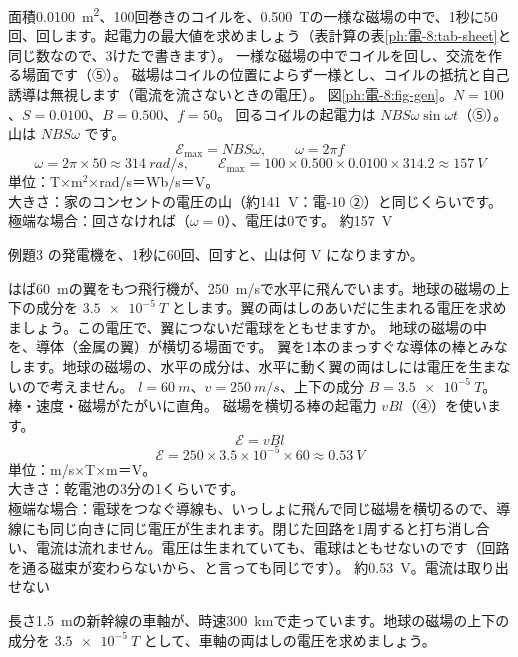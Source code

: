 \label{ph:電-8:ex3}
\begin{phreidai}
面積\qty{0.0100}{m^2}、100回巻きのコイルを、\qty{0.500}{T}の一様な磁場の中で、1秒に50回、回します。起電力の最大値を求めましょう（表計算の表\ref{ph:電-8:tab-sheet}と同じ数なので、3けたで書きます）。
\phbamen
一様な磁場の中でコイルを回し、交流を作る場面です（⑤）。
\phmushi
磁場はコイルの位置によらず一様とし、コイルの抵抗と自己誘導は無視します（電流を流さないときの電圧）。
\phzu
図\ref{ph:電-8:fig-gen}。$N=100$、$S=0.0100$、$B=0.500$、$f=50$。
\phriyu
回るコイルの起電力は $NBS\omega\sin\omega t$（⑤）。山は $NBS\omega$ です。
\phtateru
\[ \mathcal E_{\max}=NBS\omega,\qquad \omega=2\pi f \]
\phtoku
\[ \omega=2\pi\times50\approx\qty{314}{rad/s},\qquad \mathcal E_{\max}=100\times0.500\times0.0100\times314.2\approx\qty{157}{V} \]
\phtashikame
単位：T×m$^2$×rad/s＝Wb/s＝V。\\
大きさ：家のコンセントの電圧の山（約\qty{141}{V}：電-10 ②）と同じくらいです。\\
極端な場合：回さなければ（$\omega=0$）、電圧は0です。
\kotae 約\qty{157}{V}
\end{phreidai}
\begin{jibun}
例題3 の発電機を、1秒に60回、回すと、山は何 V になりますか。
\end{jibun}

\label{ph:電-8:ex4}
\begin{phreidai}[飛行機の翼に生まれる電圧]
はば\qty{60}{m}の翼をもつ飛行機が、\qty{250}{m/s}で水平に飛んでいます。地球の磁場の上下の成分を $\qty{3.5e-5}{T}$ とします。翼の両はしのあいだに生まれる電圧を求めましょう。この電圧で、翼につないだ電球をともせますか。
\phbamen
地球の磁場の中を、導体（金属の翼）が横切る場面です。
\phmushi
翼を1本のまっすぐな導体の棒とみなします。地球の磁場の、水平の成分は、水平に動く翼の両はしには電圧を生まないので考えません。
\phzu
$l=\qty{60}{m}$、$v=\qty{250}{m/s}$、上下の成分 $B=\qty{3.5e-5}{T}$。棒・速度・磁場がたがいに直角。
\phriyu
磁場を横切る棒の起電力 $vBl$（④）を使います。
\phtateru
\[ \mathcal E=vBl \]
\phtoku
\[ \mathcal E=250\times3.5\times10^{-5}\times60\approx\qty{0.53}{V} \]
\phtashikame
単位：m/s×T×m＝V。\\
大きさ：乾電池の3分の1くらいです。\\
極端な場合：電球をつなぐ導線も、いっしょに飛んで同じ磁場を横切るので、導線にも同じ向きに同じ電圧が生まれます。閉じた回路を1周すると打ち消し合い、電流は流れません。電圧は生まれていても、電球はともせないのです（回路を通る磁束が変わらないから、と言っても同じです）。
\kotae 約\qty{0.53}{V}。電流は取り出せない
\end{phreidai}
\begin{jibun}
長さ\qty{1.5}{m}の新幹線の車軸が、時速\qty{300}{km}で走っています。地球の磁場の上下の成分を $\qty{3.5e-5}{T}$ として、車軸の両はしの電圧を求めましょう。
\end{jibun}

